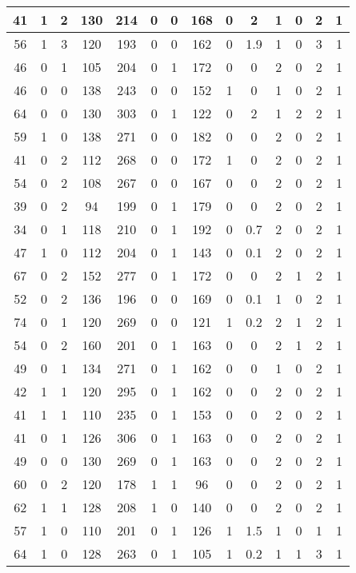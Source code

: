 \documentclass{article}
\begin{document}
\begin{longtable}{|c|c|c|c|c|c|c|c|c|c|c|c|c|c|}
\hline
41 & 1 & 2 & 130 & 214 & 0 & 0 & 168 & 0 & 2 & 1 & 0 & 2 & 1\\
\hline
56 & 1 & 3 & 120 & 193 & 0 & 0 & 162 & 0 & 1.9 & 1 & 0 & 3 & 1\\
\hline
46 & 0 & 1 & 105 & 204 & 0 & 1 & 172 & 0 & 0 & 2 & 0 & 2 & 1\\
\hline
46 & 0 & 0 & 138 & 243 & 0 & 0 & 152 & 1 & 0 & 1 & 0 & 2 & 1\\
\hline
64 & 0 & 0 & 130 & 303 & 0 & 1 & 122 & 0 & 2 & 1 & 2 & 2 & 1\\
\hline
59 & 1 & 0 & 138 & 271 & 0 & 0 & 182 & 0 & 0 & 2 & 0 & 2 & 1\\
\hline
41 & 0 & 2 & 112 & 268 & 0 & 0 & 172 & 1 & 0 & 2 & 0 & 2 & 1\\
\hline
54 & 0 & 2 & 108 & 267 & 0 & 0 & 167 & 0 & 0 & 2 & 0 & 2 & 1\\
\hline
39 & 0 & 2 & 94 & 199 & 0 & 1 & 179 & 0 & 0 & 2 & 0 & 2 & 1\\
\hline
34 & 0 & 1 & 118 & 210 & 0 & 1 & 192 & 0 & 0.7 & 2 & 0 & 2 & 1\\
\hline
47 & 1 & 0 & 112 & 204 & 0 & 1 & 143 & 0 & 0.1 & 2 & 0 & 2 & 1\\
\hline
67 & 0 & 2 & 152 & 277 & 0 & 1 & 172 & 0 & 0 & 2 & 1 & 2 & 1\\
\hline
52 & 0 & 2 & 136 & 196 & 0 & 0 & 169 & 0 & 0.1 & 1 & 0 & 2 & 1\\
\hline
74 & 0 & 1 & 120 & 269 & 0 & 0 & 121 & 1 & 0.2 & 2 & 1 & 2 & 1\\
\hline
54 & 0 & 2 & 160 & 201 & 0 & 1 & 163 & 0 & 0 & 2 & 1 & 2 & 1\\
\hline
49 & 0 & 1 & 134 & 271 & 0 & 1 & 162 & 0 & 0 & 1 & 0 & 2 & 1\\
\hline
42 & 1 & 1 & 120 & 295 & 0 & 1 & 162 & 0 & 0 & 2 & 0 & 2 & 1\\
\hline
41 & 1 & 1 & 110 & 235 & 0 & 1 & 153 & 0 & 0 & 2 & 0 & 2 & 1\\
\hline
41 & 0 & 1 & 126 & 306 & 0 & 1 & 163 & 0 & 0 & 2 & 0 & 2 & 1\\
\hline
49 & 0 & 0 & 130 & 269 & 0 & 1 & 163 & 0 & 0 & 2 & 0 & 2 & 1\\
\hline
60 & 0 & 2 & 120 & 178 & 1 & 1 & 96 & 0 & 0 & 2 & 0 & 2 & 1\\
\hline
62 & 1 & 1 & 128 & 208 & 1 & 0 & 140 & 0 & 0 & 2 & 0 & 2 & 1\\
\hline
57 & 1 & 0 & 110 & 201 & 0 & 1 & 126 & 1 & 1.5 & 1 & 0 & 1 & 1\\
\hline
64 & 1 & 0 & 128 & 263 & 0 & 1 & 105 & 1 & 0.2 & 1 & 1 & 3 & 1\\

\end{longtable}
\end{document}
